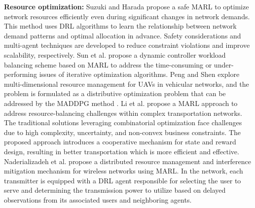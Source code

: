 \documentclass[acmsmall]{acmart}
\begin{document}
\textbf{Resource optimization:}
Suzuki and Harada \cite{9348210} propose a safe MARL to optimize network resources efficiently even during significant changes in network demands. This method uses DRL algorithms to learn the relationship between network demand patterns and optimal allocation in advance. Safety considerations and multi-agent techniques are developed to reduce constraint violations and improve scalability, respectively. 
Sun et al. \cite{SUN2020107230} propose a dynamic controller workload balancing scheme based on MARL to address the time-consuming or under-performing issues of iterative optimization algorithms. 
Peng and Shen\cite{9254093} explore multi-dimensional resource management for UAVs in vehicular networks, and the problem is formulated as a distributive optimization problem that can be addressed by the MADDPG method \cite{maddpg}. 
Li et al. \cite{li2019cooperative} propose a MARL approach to address resource-balancing challenges within complex transportation networks. The traditional solutions leveraging combinatorial optimization face challenges due to high complexity, uncertainty, and non-convex business constraints. The proposed approach introduces a cooperative mechanism for state and reward design, resulting in better transportation which is more efficient and effective. 
Naderializadeh et al.\cite{9329087} propose a distributed resource management and interference mitigation mechanism for wireless networks using MARL. In the network, each transmitter is equipped with a DRL agent responsible for selecting the user to serve and determining the transmission power to utilize based on delayed observations from its associated users and neighboring agents.
\end{document}
